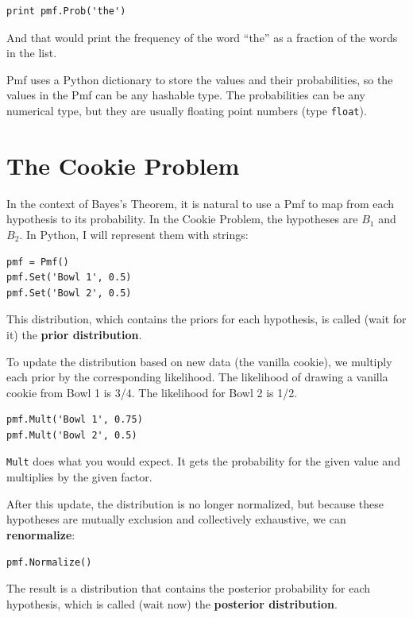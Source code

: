 \documentclass[12pt]{book}
\begin{document}
\begin{verbatim}
print pmf.Prob('the')
\end{verbatim}

And that would print the frequency of the word ``the'' as a fraction
of the words in the list.

Pmf uses a Python dictionary to store the values and their
probabilities, so the values in the Pmf can be any hashable type.
The probabilities can be any numerical type, but they are usually
floating point numbers (type \verb"float").


\section{The Cookie Problem}

In the context of Bayes's Theorem, it is natural to use a Pmf
to map from each hypothesis to its probability.  In the Cookie
Problem, the hypotheses are $B_1$ and $B_2$.  In Python, I will
represent them with strings:

\begin{verbatim}
pmf = Pmf()
pmf.Set('Bowl 1', 0.5)
pmf.Set('Bowl 2', 0.5)
\end{verbatim}

This distribution, which contains the priors for each hypothesis,
is called (wait for it) the {\bf prior distribution}.

To update the distribution based on new data (the vanilla cookie),
we multiply each prior by the corresponding likelihood.  The likelihood
of drawing a vanilla cookie from Bowl 1 is 3/4.  The likelihood
for Bowl 2 is 1/2.

\begin{verbatim}
pmf.Mult('Bowl 1', 0.75)
pmf.Mult('Bowl 2', 0.5)
\end{verbatim}

\verb"Mult" does what you would expect.  It gets the probability
for the given value and multiplies by the given factor.

After this update, the distribution is no longer normalized, but
because these hypotheses are mutually exclusion and collectively
exhaustive, we can {\bf renormalize}:

\begin{verbatim}
pmf.Normalize()
\end{verbatim}

The result is a distribution that contains the posterior probability
for each hypothesis, which is called (wait now) the
{\bf posterior distribution}.
\end{document}
